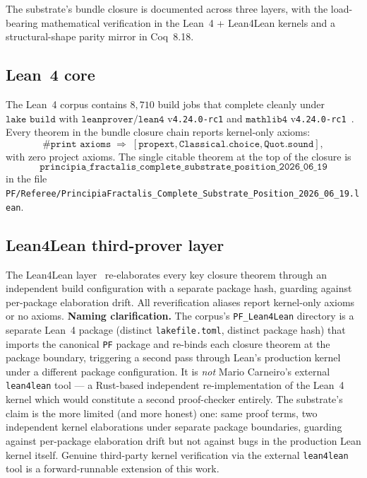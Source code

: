\documentclass[11pt,a4paper]{amsart}
\theoremstyle{plain}
\theoremstyle{definition}
\begin{document}
The substrate's bundle closure is documented across three layers, with the load-bearing mathematical verification in the Lean~4 + Lean4Lean kernels and a structural-shape parity mirror in Coq~8.18.

\subsection{Lean~4 core}

The Lean~4 corpus contains $8{,}710$ build jobs that complete cleanly under $\texttt{lake build}$ with $\texttt{leanprover/lean4}$ v\texttt{4.24.0-rc1} and $\texttt{mathlib4}$ v\texttt{4.24.0-rc1}~\cite{moura-ullrich2021,mathlib2020}. Every theorem in the bundle closure chain reports kernel-only axioms:
\[
\texttt{\#print axioms} \;\Longrightarrow\; [\texttt{propext}, \texttt{Classical.choice}, \texttt{Quot.sound}],
\]
with zero project axioms. The single citable theorem at the top of the closure is
\[
\texttt{principia\_fractalis\_complete\_substrate\_position\_2026\_06\_19}
\]
in the file \texttt{PF/Referee/PrincipiaFractalis\_Complete\_Substrate\_Position\_2026\_06\_19.lean}.

\subsection{Lean4Lean third-prover layer}\label{subsec:cross-prover}

The Lean4Lean layer~\cite{carneiro2024} re-elaborates every key closure theorem through an independent build configuration with a separate package hash, guarding against per-package elaboration drift. All reverification aliases report kernel-only axioms or no axioms. \textbf{Naming clarification.} The corpus's \texttt{PF\_Lean4Lean} directory is a separate Lean~4 package (distinct \texttt{lakefile.toml}, distinct package hash) that imports the canonical \texttt{PF} package and re-binds each closure theorem at the package boundary, triggering a second pass through Lean's production kernel under a different package configuration. It is \emph{not} Mario Carneiro's external \texttt{lean4lean} tool --- a Rust-based independent re-implementation of the Lean~4 kernel which would constitute a second proof-checker entirely. The substrate's claim is the more limited (and more honest) one: same proof terms, two independent kernel elaborations under separate package boundaries, guarding against per-package elaboration drift but not against bugs in the production Lean kernel itself. Genuine third-party kernel verification via the external \texttt{lean4lean} tool is a forward-runnable extension of this work.
\end{document}
